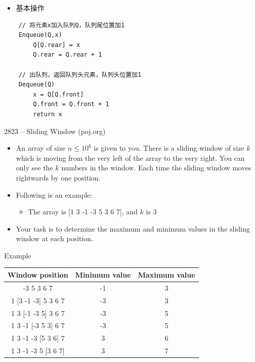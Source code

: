 \vspace*{8ex}
\begin{itemize}
    \item[] \Large{基本操作}
\end{itemize}
\begin{lstlisting}
    // 将元素x加入队列Q，队列尾位置加1
    Enqueue(Q,x)
        Q[Q.rear] = x
        Q.rear = Q.rear + 1
        
    // 出队列，返回队列头元素，队列头位置加1
    Dequeue(Q)
        x = Q[Q.front]
        Q.front = Q.front + 1
        return x
\end{lstlisting}
\begin{frame}{2823 -- Sliding Window (poj.org)}
    \begin{itemize}
        \item An array of size $n\leqslant10^6$ is given to you. There is a sliding window of size $k$ which is moving from the very left of the array to the very right. You can only see the $k$ numbers in the window. Each time the sliding window moves rightwards by one position. 
        \vfill
        \item Following is an example:
        \begin{itemize}
            \item The array is [1 3 -1 -3 5 3 6 7], and $k$ is 3
        \end{itemize}
        \vfill
        \item Your task is to determine the maximum and minimum values in the sliding window at each position.
    \end{itemize}
\end{frame}
\begin{frame}{Example}
    \begin{table}
        \centering
        \begin{tabular}{ccc}
            \hline
            Window position & Minimum value & Maximum value\\
            \hline
            [1 3 -1] -3 5 3 6 7 & -1 & 3 \\
            1 [3 -1 -3] 5 3 6 7	& -3 & 3 \\
            1 3 [-1 -3 5] 3 6 7	& -3 & 5 \\ 
            1 3 -1 [-3 5 3] 6 7	& -3 & 5 \\
            1 3 -1 -3 [5 3 6] 7	& 3 & 6 \\
            1 3 -1 -3 5 [3 6 7]	& 3 & 7 \\
            \hline
        \end{tabular}
    \end{table}
\end{frame}
